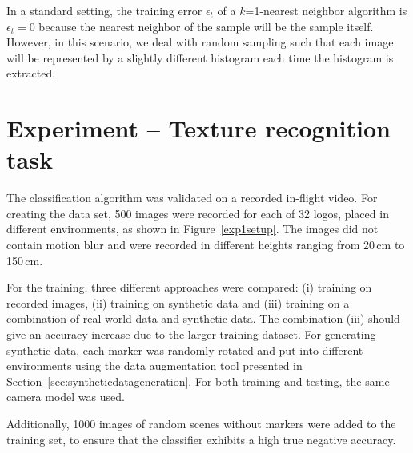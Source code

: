 In a standard setting, the training error $\epsilon_t$ of a
$k$=1-nearest neighbor algorithm is $\epsilon_t = 0$ because the
nearest neighbor of the sample will be the sample itself. However, in
this scenario, we deal with random sampling such that each image will
be represented by a slightly different histogram each time the
histogram is extracted.

\section{Experiment -- Texture recognition task} 
\label{sec:experiment1}

The classification algorithm was validated on a recorded in-flight
video. For creating the data set, 500 images were recorded for each of
32 logos, placed in different environments, as shown in
Figure~\ref{exp1setup}. The images did not contain motion blur and
were recorded in different heights ranging from 20\,cm to 150\,cm.

For the training, three different approaches were compared: (i)
training on recorded images, (ii) training on synthetic data and (iii)
training on a combination of real-world data and synthetic data.  The
combination (iii) should give an accuracy increase due to the larger
training dataset. For generating synthetic data, each marker was
randomly rotated and put into different environments using the data
augmentation tool presented in
Section~\ref{sec:syntheticdatageneration}. For both training and
testing, the same camera model was used.

Additionally, 1000 images of random scenes without markers were added
to the training set, to ensure that the classifier exhibits a high
true negative accuracy.
